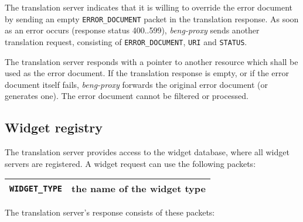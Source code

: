 \documentclass[a4paper,12pt]{article}
\begin{document}
The translation server indicates that it is willing to override the
error document by sending an empty \verb|ERROR_DOCUMENT| packet in
the translation response.  As soon as an error occurs (response status
400..599), \emph{beng-proxy} sends another translation request,
consisting of \verb|ERROR_DOCUMENT|, \verb|URI| and
\verb|STATUS|.

The translation server responds with a pointer to another resource
which shall be used as the error document.  If the translation
response is empty, or if the error document itself fails,
\emph{beng-proxy} forwards the original error document (or generates
one).  The error document cannot be filtered or processed.

\subsection{Widget registry}
\label{registry}

The translation server provides access to the widget database, where
all widget servers are registered.  A widget request can use the
following packets:

\begin{longtable}{|l|p{10cm}|}
\hline
\verb|WIDGET_TYPE| & the name of the widget type \\
\hline
\end{longtable}

The translation server's response consists of these packets:
\end{document}
